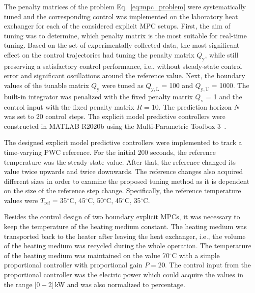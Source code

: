 \documentclass[preprint,12pt]{elsarticle}
\begin{document}
The penalty matrices of the problem Eq.~\eqref{eq:mpc_problem} were systematically tuned and the corresponding control was implemented on the laboratory heat exchanger for each of the considered explicit MPC setups. 
First, the aim of tuning was to determine, which penalty matrix is the most suitable for real-time tuning. Based on the set of experimentally collected data, the most significant effect on the control trajectories had tuning the penalty matrix $Q_\mathrm{y}$, while still preserving a satisfactory control performance, i.e., without steady-state control error and significant oscillations around the reference value. Next, the boundary values of the tunable matrix $Q_\mathrm{y}$ were tuned as $Q_\mathrm{y, L}$ = 100 and $Q_\mathrm{y, U}$ = 1000. The built-in integrator was penalized with the fixed penalty matrix $Q_\mathrm{x}$ = 1 and the control input with the fixed penalty matrix $R$ = 10. The prediction horizon $N$ was set to 20 control steps. The explicit model predictive controllers were constructed in MATLAB R2020b using the Multi-Parametric Toolbox 3~\cite{mpt_conf}. 


The designed explicit model predictive controllers were implemented to track a time-varying PWC reference. 
For the initial 200 seconds, the reference temperature was the steady-state value. After that, the reference changed its value twice upwards and twice downwards. The reference changes also acquired different sizes in order to examine the proposed tuning method as it is dependent on the size of the reference step change. Specifically, the reference temperature values were $T_{\mathrm{ref}}$ = 35$^{\circ}\mathrm{C}$, 45$^{\circ}\mathrm{C}$, 50$^{\circ}\mathrm{C}$, 45$^{\circ}\mathrm{C}$, 35$^{\circ}\mathrm{C}$.

Besides the control design of two boundary explicit MPCs, it was necessary to keep the temperature of the heating medium constant. The heating medium was transported back to the heater after leaving the heat exchanger, i.e., the volume of the heating medium was recycled during the whole operation. The temperature of the heating medium was maintained on the value 70$^{\circ}\mathrm{C}$ with a simple proportional controller with proportional gain $P = 20$. The control input from the proportional controller was the electric power which could acquire the values in the range [$0-2$]\,kW and was also normalized to percentage.
\end{document}
